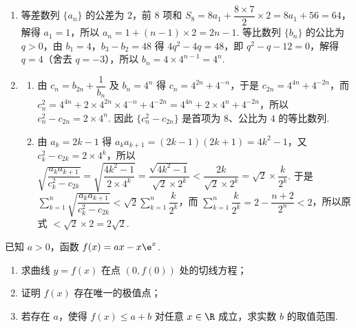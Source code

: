 \begin{solution}
\begin{enumerate}
\item 等差数列 \(\{a_n\}\) 的公差为 \(2\)，前 \(8\) 项和 \(S_8=8a_1+\dfrac{8\times7}2\times2=8a_1+56=64\)，解得 \(a_1=1\)，所以 \(a_n=1+(n-1)\times2=2n-1\). 等比数列 \(\{b_n\}\) 的公比为 \(q>0\)，由 \(b_1=4\)，\(b_3-b_2=48\) 得 \(4q^2-4q=48\)，即 \(q^2-q-12=0\)，解得 \(q=4\)（舍去 \(q=-3\)），所以 \(b_n=4\times4^{n-1}=4^n\).

\item
\begin{enumerate}
\item 由 \(c_n=b_{2n}+\dfrac1{b_n}\) 及 \(b_n=4^n\) 得 \(c_n=4^{2n}+4^{-n}\)，于是 \(c_{2n}=4^{4n}+4^{-2n}\)，而 \(c_n^2=4^{4n}+2\times4^{2n}\times4^{-n}+4^{-2n}=4^{4n}+2\times4^n+4^{-2n}\)，所以 \(c_n^2-c_{2n}=2\times4^n\). 因此 \(\{c_n^2-c_{2n}\}\) 是首项为 \(8\)、公比为 \(4\) 的等比数列.

\item 由 \(a_k=2k-1\) 得 \(a_ka_{k+1}=(2k-1)(2k+1)=4k^2-1\)，又 \(c_k^2-c_{2k}=2\times4^k\)，所以 \(\sqrt{\dfrac{a_ka_{k+1}}{c_k^2-c_{2k}}}=\sqrt{\dfrac{4k^2-1}{2\times4^k}}=\dfrac{\sqrt{4k^2-1}}{\sqrt2\times2^k}<\dfrac{2k}{\sqrt2\times2^k}=\sqrt2\times\dfrac k{2^k}\). 于是 \(\displaystyle\sum_{k=1}^n\sqrt{\dfrac{a_ka_{k+1}}{c_k^2-c_{2k}}}<\sqrt2\sum_{k=1}^n\dfrac k{2^k}\)，而 \(\displaystyle\sum_{k=1}^n\dfrac k{2^k}=2-\dfrac{n+2}{2^n}<2\)，所以原式 \(<\sqrt2\times2=2\sqrt2\).
\end{enumerate}
\end{enumerate}
\end{solution}

\begin{problem}
已知 \( a>0 \)，函数 \( f(x)=ax-x\e^x \).

\begin{enumerate}
\item 求曲线 \( y=f(x) \) 在点 \( \left( 0,f(0) \right) \) 处的切线方程；
\item 证明 \( f(x) \) 存在唯一的极值点；
\item 若存在 \( a \)，使得 \( f(x)\le a+b \) 对任意 \( x\in \R \) 成立，求实数 \( b \) 的取值范围.
\end{enumerate}
\end{problem}

